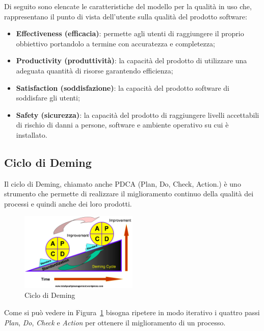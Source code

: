 Di seguito sono elencate le caratteristiche del modello per la qualità in uso che, rappresentano il punto di vista dell'utente sulla qualità del prodotto software:

\begin{itemize}
	\item \textbf{Effectiveness (efficacia)}:  permette agli utenti di raggiungere il proprio obbiettivo portandolo a termine con accuratezza e completezza;

	\item \textbf{Productivity (produttività)}: la capacità del prodotto di utilizzare una adeguata quantità di risorse garantendo efficienza;

	\item \textbf{Satisfaction (soddisfazione)}: la capacità del prodotto software di soddisfare gli utenti;

	\item \textbf{Safety (sicurezza)}: la capacità del prodotto di raggiungere livelli accettabili di rischio di danni a persone, software e ambiente operativo su cui è installato.
\end{itemize}

\subsection{Ciclo di Deming}
Il ciclo di Deming, chiamato anche PDCA (Plan, Do, Check, Action.) è uno strumento che permette di realizzare il miglioramento continuo della qualità dei processi e quindi anche dei loro prodotti.

\begin{figure}[h!]
	\centering
	\includegraphics[width=0.50\textwidth]{img/deming.png}
	\caption{Ciclo di Deming}
	\label{fig:PDCA}
\end{figure}

Come si può vedere in Figura~\ref{fig:PDCA} bisogna ripetere in modo iterativo i quattro passi \emph{Plan}, \emph{Do}, \emph{Check} e \emph{Action} per ottenere il miglioramento di un processo.

